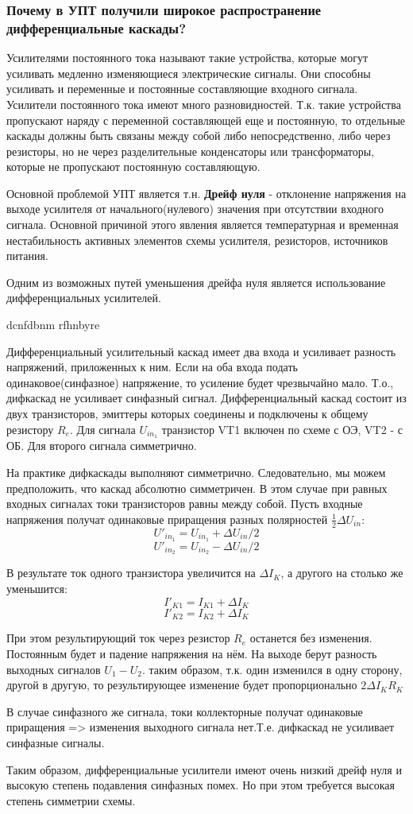 \subsubsection{Почему в УПТ получили широкое распространение дифференциальные каскады?}

Усилителями постоянного тока называют такие устройства, которые могут усиливать медленно изменяющиеся электрические сигналы. Они способны усиливать и переменные и постоянные составляющие входного сигнала. Усилители постоянного тока имеют много разновидностей. Т.к. такие устройства пропускают наряду с переменной составляющей еще и постоянную, то отдельные каскады должны быть связаны между собой либо непосредственно, либо через резисторы, но не через разделительные конденсаторы или трансформаторы, которые не пропускают постоянную составляющую.

Основной проблемой УПТ является т.н. \textbf{Дрейф нуля} - отклонение напряжения на выходе усилителя от начального(нулевого) значения при отсутствии входного сигнала. Основной причиной этого явления является температурная и временная нестабильность активных элементов схемы усилителя, резисторов, источников питания.

Одним из возможных путей уменьшения дрейфа нуля является использование дифференциальных усилителей.

dcnfdbnm rfhnbyre

Дифференциальный усилительный каскад имеет два входа и усиливает разность напряжений, приложенных к ним. Если на оба входа подать одинаковое(синфазное) напряжение, то усиление будет чрезвычайно мало. Т.о., дифкаскад не усиливает синфазный сигнал. Дифференциальный каскад состоит из двух транзисторов, эмиттеры которых соединены и подключены к общему резистору $R_e$. Для сигнала $U_{in_1}$ транзистор VT1 включен по схеме с ОЭ, VT2 - с ОБ. Для второго сигнала симметрично.

На практике дифкаскады выполняют симметрично. Следовательно, мы можем предположить, что каскад абсолютно симметричен. В этом случае при равных входных сигналах токи транзисторов равны между собой. Пусть входные напряжения получат одинаковые приращения разных полярностей $\frac{1}{2}\Delta U_{in}$:
$$
U'_{in_1} = U_{in_1} + \Delta U_{in}/2
$$
$$
U'_{in_2} = U_{in_2} - \Delta U_{in}/2
$$ 

В результате ток одного транзистора увеличится на $\Delta I_K$, а другого на столько же уменьшится:
$$
I'_{K1} = I_{K1} + \Delta I_K
$$ 
$$
I'_{K2} = I_{K2} + \Delta I_K
$$ 

При этом результирующий ток через резистор $R_e$ останется без изменения. Постоянным будет и падение напряжения на нём. На выходе берут разность выходных сигналов $U_1 - U_2$. таким образом, т.к. один изменился в одну сторону, другой в другую, то результирующее изменение будет пропорционально $2\Delta I_K R_K$

В случае синфазного же сигнала, токи коллекторные получат одинаковые приращения => изменения выходного сигнала нет.Т.е. дифкаскад не усиливает синфазные сигналы.

Таким образом, дифференциальные усилители имеют очень низкий дрейф нуля и высокую степень подавления синфазных помех. Но при этом требуется высокая степень симметрии схемы.
